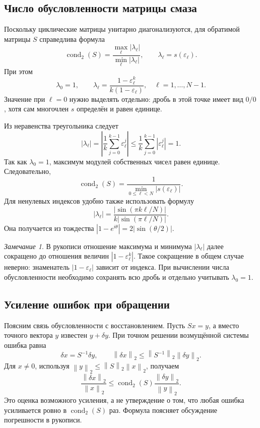 \documentclass[12pt,a4paper]{article}
\theoremstyle{definition}
\theoremstyle{remark}
\newtheorem*{remark}{Замечание}
\DeclareMathOperator{\cond}{cond}
\newcommand{\eps}{\varepsilon}
\newcommand{\norm}[1]{\left\lVert #1\right\rVert}
\begin{document}
\subsection{Число обусловленности матрицы смаза}

Поскольку циклические матрицы унитарно диагонализуются, для обратимой
матрицы $S$ справедлива формула
\[
  \cond_2(S)=\frac{\max_\ell|\lambda_\ell|}
                   {\min_\ell|\lambda_\ell|},
  \qquad\lambda_\ell=s(\eps_\ell).
\]
При этом
\[
  \lambda_0=1,\qquad
  \lambda_\ell=\frac{1-\eps_\ell^k}{k(1-\eps_\ell)},
  \quad\ell=1,\dots,N-1.
\]
Значение при $\ell=0$ нужно выделять отдельно: дробь в этой точке
имеет вид $0/0$, хотя сам многочлен $s$ определён и равен единице.

Из неравенства треугольника следует
\[
  |\lambda_\ell|
  =\left|\frac1k\sum_{j=0}^{k-1}\eps_\ell^j\right|
  \leqslant\frac1k\sum_{j=0}^{k-1}|\eps_\ell^j|=1.
\]
Так как $\lambda_0=1$, максимум модулей собственных чисел равен единице.
Следовательно,
\[
  \boxed{\cond_2(S)=\frac1{\min_{0\leqslant\ell<N}|s(\eps_\ell)|}}.
\]
Для ненулевых индексов удобно также использовать формулу
\[
  |\lambda_\ell|
  =\frac{|\sin(\pi k\ell/N)|}{k|\sin(\pi\ell/N)|}.
\]
Она получается из тождества $|1-e^{i\theta}|=2|\sin(\theta/2)|$.

\begin{remark}
В рукописи отношение максимума и минимума $|\lambda_\ell|$ далее
сокращено до отношения величин $|1-\eps_\ell^k|$. Такое сокращение
в общем случае неверно: знаменатель $|1-\eps_\ell|$ зависит от индекса.
При вычислении числа обусловленности необходимо сохранять всю дробь
и отдельно учитывать $\lambda_0=1$.
\end{remark}

\subsection{Усиление ошибок при обращении}

Поясним связь обусловленности с восстановлением. Пусть $Sx=y$, а вместо
точного вектора $y$ известен $y+\delta y$. При точном решении возмущённой
системы ошибка равна
\[
  \delta x=S^{-1}\delta y,
  \qquad\norm{\delta x}_2\leqslant\norm{S^{-1}}_2\norm{\delta y}_2.
\]
Для $x\ne0$, используя $\norm{y}_2\leqslant\norm{S}_2\norm{x}_2$,
получаем
\[
  \frac{\norm{\delta x}_2}{\norm{x}_2}
  \leqslant\cond_2(S)\frac{\norm{\delta y}_2}{\norm{y}_2}.
\]
Это оценка возможного усиления, а не утверждение о том, что любая ошибка
усиливается ровно в $\cond_2(S)$ раз. Формула поясняет обсуждение
погрешности в рукописи.
\end{document}
